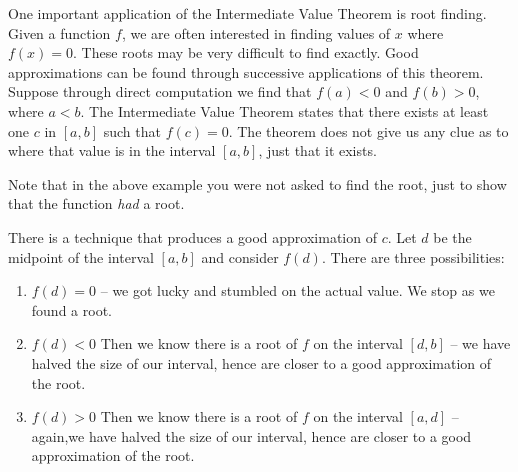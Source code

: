 

One important application of the Intermediate Value Theorem is root finding. Given a function $f$, we are often interested in finding values of $x$ where $f(x) = 0$. These roots may be very difficult to find exactly. Good approximations can be found through successive applications of this theorem. Suppose through direct computation we find that $f(a) <0 $ and $f(b)>0$, where $a<b$. The Intermediate Value Theorem states that there exists at least one $c$ in $[a,b]$ such that $f(c) = 0$. The theorem does not give us any clue as to where that value is in the interval $[a,b]$, just that it exists. 


Note that in the above example you were not asked to find the root, just to show that the function \emph{had} a root. %

There is a technique that produces a good approximation of $c$. Let $d$ be the midpoint of the interval $[a,b]$ and consider $f(d)$. There are three possibilities:
\begin{enumerate}
	\item	$f(d) = 0$ -- we got lucky and stumbled on the actual value. We stop as we found a root.
	\item	$f(d) <0$ Then we know there is a root of $f$ on the interval $[d,b]$ -- we have halved the size of our interval, hence are closer to a good approximation of the root.
	\item	$f(d) >0$ Then we know there is a root of $f$ on the interval $[a,d]$ -- again,we have halved the size of our interval, hence are closer to a good approximation of the root.
\end{enumerate}

